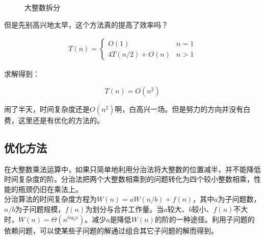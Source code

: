 \begin{figure}[H]
	\centering
	\caption{大整数拆分}
\end{figure}

但是先别高兴地太早，这个方法真的提高了效率吗？

\vspace{-0.5cm}

\begin{align*}
	T(n) = \begin{cases}
		O(1)           & n = 1 \\
		4T(n/2) + O(n) & n > 1
	\end{cases}
\end{align*}

求解得到：

\vspace{-0.5cm}

$$
	T(n) = O(n^2)
$$

闹了半天，时间复杂度还是$ O(n^2) $啊，白高兴一场。但是努力的方向并没有白费，这里还是有优化的方法的。\\

\subsection{优化方法}

在大整数乘法运算中，如果只简单地利用分治法将大整数的位置减半，并不能降低时间复杂度的阶。分治法把两个大整数相乘到的问题转化为四个较小整数相乘，性能的瓶颈仍旧在乘法上。\\

分治算法的时间复杂度方程为$ W(n) = aW(n/b) + f(n) $，其中$ a $为子问题数，$ n / b $为子问题规模，$ f(n) $为划分与合并工作量。当$ a $较大、$ b $较小、$ f(n) $不大时，$ W(n) = \Theta(n^{log_ba}) $。减少$ a $是降低$ W(n) $的阶的一种途径。利用子问题的依赖问题，可以使某些子问题的解通过组合其它子问题的解而得到。\\

